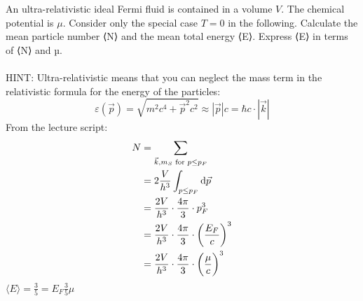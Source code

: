 An ultra-relativistic ideal Fermi fluid is contained in a 
volume $V$. The chemical potential is $\mu$. Consider only 
the special case $T=0$ in the following. Calculate the mean 
particle number ⟨N⟩ and the mean total energy ⟨E⟩. 
Express ⟨E⟩ in terms of ⟨N⟩ and µ. \\
\\
HINT: Ultra-relativistic means that you can neglect the mass 
term in the relativistic formula for the energy of the 
particles:
\begin{equation}
    \varepsilon(\vec p)=\sqrt{m^2c^4+\vec p^2c^2}
    \approx |\vec p|c
    =\hbar c\cdot|\vec k|
\end{equation}
From the lecture script:
\begin{align}
    N
    &=\sum_{\vec k,m_S\textnormal{  for } p\le p_F} \\
    &=2\frac{V}{h^3}\int_{p\le p_F}\mathrm{d}\vec p \\
    &=\frac{2V}{h^3}\cdot\frac{4\pi}{3}\cdot p_F^3 \\
    &=\frac{2V}{h^3}\cdot
    \frac{4\pi}{3}\cdot\bigg(\frac{E_F}{c}\bigg)^3 \\
    &=\frac{2V}{h^3}\cdot
    \frac{4\pi}{3}\cdot\bigg(\frac{\mu}{c}\bigg)^3
\end{align}
$\langle E\rangle=\frac{3}{5}=E_F\frac{3}{5}\mu$
